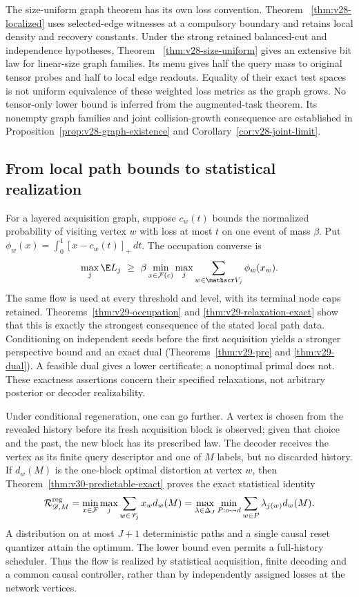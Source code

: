 The size-uniform graph theorem has its own loss convention. Theorem~
\ref{thm:v28-localized} uses selected-edge witnesses at a compulsory
boundary and retains local density and recovery constants. Under the
strong retained balanced-cut and independence hypotheses, Theorem~
\ref{thm:v28-size-uniform} gives an extensive bit law for linear-size
graph families. Its menu gives half the query mass to original tensor
probes and half to local edge readouts. Equality of their exact test
spaces is not uniform equivalence of these weighted loss metrics as
the graph grows. No tensor-only lower bound is inferred from the
augmented-task theorem. Its nonempty graph families and joint
collision-growth consequence are established in
Proposition~\ref{prop:v28-graph-existence} and
Corollary~\ref{cor:v28-joint-limit}.

\subsection{From local path bounds to statistical realization}
For a layered acquisition graph, suppose $c_w(t)$ bounds the normalized
probability of visiting vertex $w$ with loss at most $t$ on one event
of mass $\beta$. Put $\phi_w(x)=\int_0^1[x-c_w(t)]_+\,dt$.
The occupation converse is
\[
 \max_j\E L_j\ \ge\ \beta
    \min_{x\in\mathcal F(c)}\max_j
                   \sum_{w\in\mathscr V_j}\phi_w(x_w).
\]
The same flow is used at every threshold and level, with its terminal
node caps retained. Theorems~\ref{thm:v29-occupation} and
\ref{thm:v29-relaxation-exact} show that this is exactly the strongest
consequence of the stated local path data. Conditioning on independent
seeds before the first acquisition yields a stronger perspective bound
and an exact dual (Theorems~\ref{thm:v29-pre} and \ref{thm:v29-dual}).
A feasible dual gives a lower certificate; a nonoptimal primal does not.
These exactness assertions concern their specified relaxations, not
arbitrary posterior or decoder realizability.

Under conditional regeneration, one can go further. A vertex is chosen
from the revealed history before its fresh acquisition block is
observed; given that choice and the past, the new block has its prescribed
law. The decoder receives the vertex as its finite query descriptor
and one of $M$ labels, but no discarded history. If $d_w(M)$ is the
one-block optimal distortion at vertex $w$, then
Theorem~\ref{thm:v30-predictable-exact} proves the exact statistical
identity
\begin{equation}\label{eq:v30-intro-network}
 \mathcal R_{\mathscr D,M}^{\rm reg}
   =\min_{x\in\mathcal F}\max_j\sum_{w\in\mathscr V_j}x_wd_w(M)
   =\max_{\lambda\in\Delta_J}\min_{P:o\rightsquigarrow d}
                       \sum_{w\in P}\lambda_{j(w)}d_w(M).
\end{equation}
A distribution on at most $J+1$ deterministic paths and a single causal
reset quantizer attain the optimum. The lower bound even permits a
full-history scheduler. Thus the flow is realized by statistical
acquisition, finite decoding and a common causal controller, rather
than by independently assigned losses at the network vertices.

